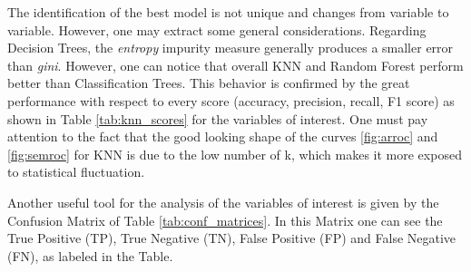 \documentclass[a4paper,11pt,dvipsnames]{article}
\begin{document}
The identification of the best model is not unique and changes from variable to variable. However, one may extract some general considerations. Regarding Decision Trees, the \textit{entropy} impurity measure generally produces a smaller error than \textit{gini}. However, one can notice that overall KNN and Random Forest perform better than Classification Trees. This behavior is confirmed by the great performance with respect to every score (accuracy, precision, recall, F1 score) as shown in Table \ref{tab:knn_scores} for the variables of interest.
One must pay attention to the fact that the good looking shape of the curves \ref{fig:arroc} and \ref{fig:semroc} for KNN is due to the low number of k, which makes it more exposed to statistical fluctuation. 

Another useful tool for the analysis of the variables of interest is given by the Confusion Matrix of Table \ref{tab:conf_matrices}. In this Matrix one can see the True Positive (TP), True Negative (TN), False Positive (FP) and False Negative (FN), as labeled in the Table.

\begin{table}[h]
    \centering
    \caption{Confusion Matrices for variable of interests according to the different algorithms.\\ Green indicates the True Positives, while Yellow the True Negatives.}
    \label{tab:conf_matrices}
\end{table}
\end{document}
